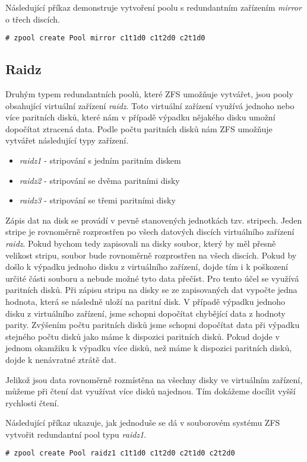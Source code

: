 Následující příkaz demonstruje vytvoření poolu s redundantním zařízením \emph{mirror} o třech discích.
\begin{verbatim}
# zpool create Pool mirror c1t1d0 c1t2d0 c2t1d0
\end{verbatim}

\subsection{Raidz}
Druhým typem redundantních poolů, které ZFS umožňuje vytvářet, jsou pooly obsahující virtuální zařízení \emph{raidz}. Toto virtuální zařízení využívá jednoho nebo více paritních disků, které nám v případě výpadku nějakého disku umožní dopočítat ztracená data. Podle počtu paritních disků nám ZFS umožňuje vytvářet následující typy zařízení.
\begin{itemize}
  \item \emph{raidz1} - stripování s jedním paritním diskem
  \item \emph{raidz2} - stripování se dvěma paritními disky
  \item \emph{raidz3} - stripování se třemi paritními disky
\end{itemize}

Zápis dat na disk se provádí v pevně stanovených jednotkách tzv. stripech. Jeden stripe je rovnoměrně rozprostřen po všech datových discích virtuálního zařízení \emph{raidz}. Pokud bychom tedy zapisovali na disky soubor, který by měl přesně velikost stripu, soubor bude rovnoměrně rozprostřen na všech discích. Pokud by došlo k výpadku jednoho disku z virtuálního zařízení, dojde tím i k poškození určité části souboru a nebude možné tyto data přečíst. Pro tento účel se využívá paritních disků. Při zápisu stripu na disky se ze zapisovaných dat vypočte jedna hodnota, která se následně uloží na paritní disk. V případě výpadku jednoho disku z virtuálního zařízení, jsme schopni dopočítat chybějící data z hodnoty parity. Zvýšením počtu paritních disků jsme schopni dopočítat data při výpadku stejného počtu disků jako máme k dispozici paritních disků.
Pokud dojde v jednom okamžiku k výpadku více disků, než máme k dispozici paritních disků, dojde k nenávratné ztrátě dat.

Jelikož jsou data rovnoměrně rozmístěna na všechny disky ve virtuálním zařízení, můžeme při čtení dat využívat více disků najednou. Tím dokážeme docílit vyšší rychlosti čtení.

Následující příkaz ukazuje, jak jednoduše se dá v souborovém systému ZFS vytvořit redundantní pool typu \emph{raidz1}.
\begin{verbatim}
# zpool create Pool raidz1 c1t1d0 c1t2d0 c2t1d0 c2t2d0
\end{verbatim}


